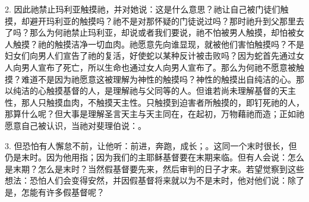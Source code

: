 2. 因此祂禁止玛利亚触摸祂，并对她说：这是什么意思？祂让自己被门徒们触摸，却避开玛利亚的触摸吗？祂不是对那怀疑的门徒说过吗？那时祂升到父那里去了吗？那么为何祂禁止玛利亚，却说或者我们要说，祂不怕被男人触摸，却怕被女人触摸？祂的触摸洁净一切血肉。祂愿意先向谁显现，就被他们害怕触摸吗？不是妇女们向男人们宣告了祂的复活，好使蛇以某种反计被击败吗？因为蛇首先通过女人向男人宣布了死亡，所以生命也通过女人向男人宣布了。那么为何祂不愿意被触摸？难道不是因为祂愿意这被理解为神性的触摸吗？神性的触摸出自纯洁的心。那以纯洁的心触摸基督的人，是理解祂与父同等的人。但谁若尚未理解基督的天主性，那人只触摸血肉，不触摸天主性。只触摸到迫害者所触摸的，即钉死祂的人，那算什么呢？但大事是理解圣言天主与天主同在，在起初，万物藉祂而造；正如祂愿意自己被认识，当祂对斐理伯说：。\par

3. 但恐怕有人懈怠不前，让他听：前进，奔跑，成长；。这同一个末时很长，但仍是末时。因为他用指；因为我们的主耶稣基督要在末期来临。但有人会说：怎么是末期？怎么是末时？当然假基督要先来，然后审判的日子才来。若望觉察到这些想法：恐怕人们会变得安然，并因假基督将来就以为不是末时，他对他们说：除了是，怎能有许多假基督呢？\par


